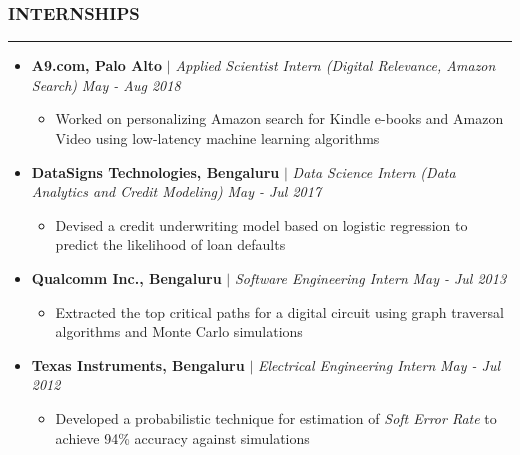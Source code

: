 \documentclass[10pt,a4paper,English]{article}
\newcommand\roottitle[1]{\vspace{-4mm}\subsubsection*{\uppercase{#1}}\vspace{-0.3em}\nopagebreak[4]\hrule\vspace{4mm}}
\newcommand\itemyear[1]{\hfill \emph{\color{itemyear} #1}}
\newcommand\itemenv{\setlength\itemsep{0.5pt} \addtolength{\itemindent}{-5mm}\vspace{-1.5mm}}
\newcommand\itemenvnoindent{\setlength\itemsep{-1pt} \vspace{-1.5mm}}
\begin{document}
\roottitle{Internships}
\begin{itemize}[leftmargin=11pt] \itemenvnoindent
        
    \item \textbf{A9.com, Palo Alto} $|$ \textit{Applied Scientist Intern (Digital Relevance, Amazon Search)} \itemyear{May - Aug 2018}
        \begin{itemize} \itemenv
            \item Worked on personalizing Amazon search for Kindle e-books and Amazon Video using low-latency machine learning algorithms
        \end{itemize}

    \item \textbf{DataSigns Technologies, Bengaluru} $|$ \textit{Data Science Intern (Data Analytics and Credit Modeling)} \itemyear{May - Jul 2017}
    \begin{itemize} \itemenv
        \item Devised a credit underwriting model based on logistic regression to predict the likelihood of loan defaults
    \end{itemize}

    \item \textbf{Qualcomm Inc., Bengaluru} $|$ \textit{Software Engineering Intern} \itemyear{May - Jul 2013}
    \begin{itemize} \itemenv
        \item Extracted the top critical paths for a digital circuit using graph traversal algorithms and Monte Carlo simulations
    \end{itemize}

    \item \textbf{Texas Instruments, Bengaluru} $|$ \textit{Electrical Engineering Intern} \itemyear{May - Jul 2012}
    \begin{itemize} \itemenv
        \item Developed a probabilistic technique for estimation of \emph{Soft Error Rate} to achieve 94\% accuracy against simulations
    \end{itemize}

    \end{itemize}
\end{document}
